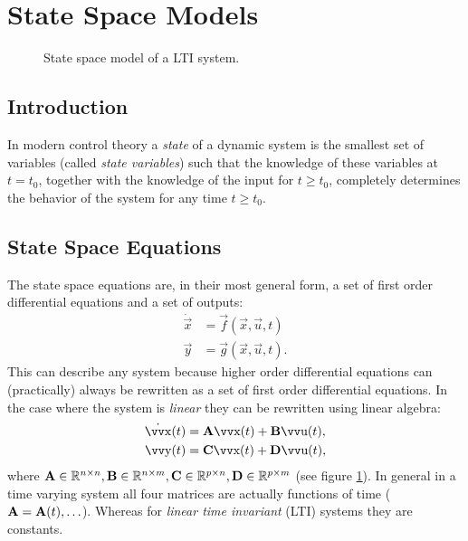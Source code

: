 
\section{State Space Models}

\begin{figure}
	\centering
	\resizebox{\linewidth}{!}{
		
	}
	\caption{
		State space model of a LTI system.
		\label{fig:ss-model}
	}
\end{figure}

\subsection{Introduction}

In modern control theory a \emph{state} of a dynamic system is the smallest set of variables (called \emph{state variables}) such that the knowledge of these variables at \(t = t_0\), together with the knowledge of the input for \(t \geq t_0\), completely determines the behavior of the system for any time \(t \geq t_0\).

\subsection{State Space Equations}

The state space equations are, in their most general form, a set of first order differential equations and a set of outputs:
\begin{align*}
	\dot{\vec{x}} &= \vec{f}(\vec{x}, \vec{u}, t) \\
	\vec{y} &= \vec{g}(\vec{x}, \vec{u}, t).
\end{align*}
This can describe any system because higher order differential equations can (practically) always be rewritten as a set of first order differential equations. In the case where the system is \emph{linear} they can be rewritten using linear algebra:
\begin{align*}
	\dot{\vec{x}}(t) & = \mx{A} \vec{x}(t) + \mx{B} \vec{u}(t), \\
	\vec{y}(t)       & = \mx{C} \vec{x}(t) + \mx{D} \vec{u}(t),
\end{align*}
where \(
	\bm{\mathrm{A}} \in \mathbb{R}^{n \times n},
	\bm{\mathrm{B}} \in \mathbb{R}^{n \times m},
	\bm{\mathrm{C}} \in \mathbb{R}^{p \times n},
	\bm{\mathrm{D}} \in \mathbb{R}^{p \times m}
\)
(see figure \ref{fig:ss-model}).  In general in a time varying system all four matrices are actually functions of time (\(\bm{\mathrm{A}} = \bm{\mathrm{A}}(t), \ldots\)). Whereas for \emph{linear time invariant} (LTI) systems they are constants.

